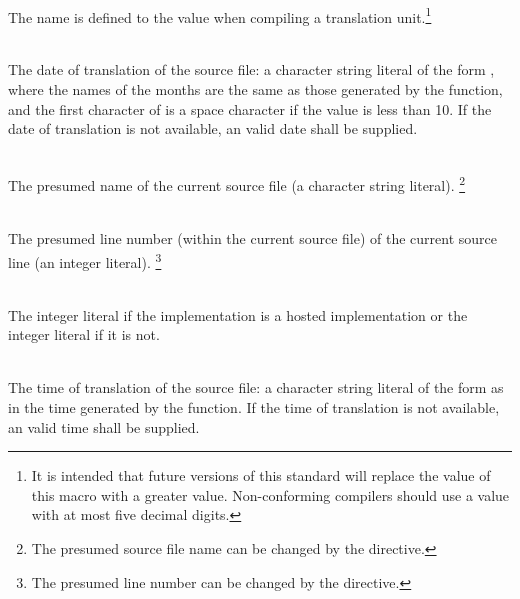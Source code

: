 \begin{description}

%
\item {}\\
The name  is defined
to the value
\tcode{\cppver}
when
compiling a \Cpp translation unit.\footnote{It is intended that future
versions of this standard will
replace the value of this macro with a greater value.
Non-conforming compilers should use a value with at most
five decimal digits.}

%
\item {}\\
The date of translation of the source file:
a character string literal of the form
,
where the names of the months are the same as those generated
by the
function,
and the first character of
is a space character if the value is less than 10.
If the date of translation is not available,
an  valid date
shall be supplied.

%
\item {}\\
The presumed name of the current source file (a character string
literal).%
\footnote{The presumed source file name can be changed by the  directive.}

%
\item {}\\
The presumed line number (within the current source file) of the current source line
(an integer literal).%
\footnote{The presumed line number can be changed by the  directive.}

%
%
\item {}\\
The integer literal  if the implementation is a hosted
implementation or the integer literal  if it is not.

%
\item {}\\
The time of translation of the source file:
a character string literal of the form
as in the time generated by the
function.
If the time of translation is not available,
an  valid time shall be supplied.
\end{description}

